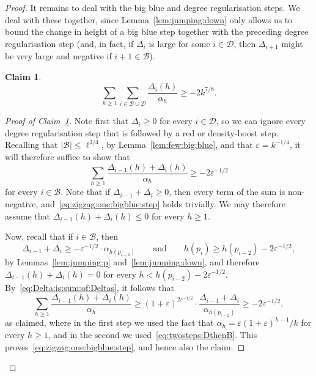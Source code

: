 \documentclass[12pt,reqno]{amsart}
\newtheorem{claim}[theorem]{Claim}
\theoremstyle{definition}
\theoremstyle{remark}
\newenvironment{clmproof}[1]{\begin{proof}[Proof of Claim~\ref{#1}]\let\qednow\qedsymbol\renewcommand{\qedsymbol}{}}{\; \qednow \end{proof}}
\newcommand\cB{\mathcal{B}}
\newcommand\eps{\varepsilon}
\renewcommand{\le}{\leqslant}
\renewcommand{\ge}{\geqslant}
\def\eps{\varepsilon}
\def\cD{\mathcal{D}}
\def\cR{\mathcal{R}}
\def\cB{\mathcal{B}}
\begin{document}
\begin{proof}

It remains to deal with the big blue and degree regularisation steps. We deal with these together, since Lemma~\ref{lem:jumping:down} only allows us to bound the change in height of a big blue step together with the preceding degree regularisation step (and, in fact, if $\Delta_i$ is large for some $i \in \cD$, then $\Delta_{i+1}$ might be very large and negative if $i+1 \in \cB$). 

\begin{claim}\label{claim:bigblue:sum}
\begin{equation}\label{eq:zigzag:bigblue:steps} 
\sum_{h \ge 1} \sum_{i \in \cB \cup \cD} \frac{\Delta_i(h)}{\alpha_h} \ge - 2 k^{7/8}.
\end{equation} 
\end{claim}

\begin{clmproof}{claim:bigblue:sum}
Note first that $\Delta_i \ge 0$ for every $i \in \cD$, so we can ignore every degree regularisation step that is followed by a red or density-boost step. Recalling that $|\cB| \le \ell^{3/4}$, by Lemma~\ref{lem:few:big:blue}, and that $\eps = k^{-1/4}$, it will therefore suffice to show that 
\begin{equation}\label{eq:zigzag:one:bigblue:step} 
\sum_{h \ge 1} \frac{\Delta_{i-1}(h) + \Delta_i(h)}{\alpha_h} \ge - 2\eps^{-1/2}
\end{equation} 
for every $i \in \cB$. Note that if $\Delta_{i-1} + \Delta_i \ge 0$, then every term of the sum is non-negative, and~\eqref{eq:zigzag:one:bigblue:step} holds trivially. We may therefore assume that $\Delta_{i-1}(h) + \Delta_i(h) \le 0$ for every $h \ge 1$. 

Now, recall that if $i \in \cB$, then
\begin{equation}\label{eq:twosteps:DthenB}
\Delta_{i-1} + \Delta_i \ge - \eps^{-1/2} \cdot \alpha_{h(p_{i-2})} \qquad \text{and} \qquad h(p_i) \ge h(p_{i-2}) - 2\eps^{-1/2},
\end{equation}
by %
Lemmas~\ref{lem:jumping:p} and~\ref{lem:jumping:down}, and therefore $\Delta_{i-1}(h) + \Delta_i(h) = 0$ for every $h < h(p_{i-2}) - 2\eps^{-1/2}$. By~\eqref{eq:Delta:is:sum:of:Deltas}, it follows that 
$$\sum_{h \ge 1} \frac{\Delta_{i-1}(h) + \Delta_i(h)}{\alpha_h} \ge (1 + \eps)^{2\eps^{-1/2}} \cdot \frac{\Delta_{i-1} + \Delta_i}{\alpha_{h(p_{i-2})}} \ge -2\eps^{-1/2},$$
as claimed, where in the first step we used the fact that $\alpha_h = \eps (1+\eps)^{h-1} / k$ for every $h \ge 1$, and in the second we used~\eqref{eq:twosteps:DthenB}. This proves~\eqref{eq:zigzag:one:bigblue:step}, and hence also the claim.
 \end{clmproof}


\end{proof}
\end{document}
